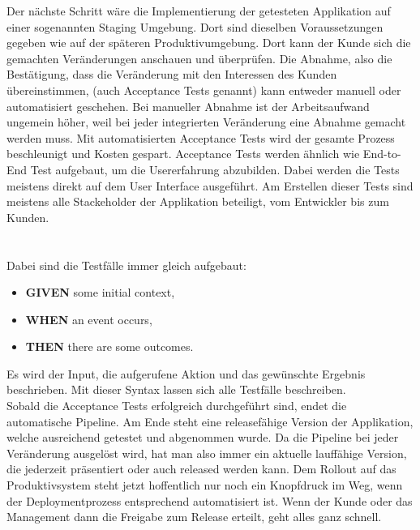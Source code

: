  Der nächste Schritt wäre die Implementierung der getesteten Applikation auf einer sogenannten Staging Umgebung. Dort sind dieselben Voraussetzungen gegeben wie auf der späteren Produktivumgebung.\autocite[Vgl.][S.283]{Farley.2010} Dort kann der Kunde sich die gemachten Veränderungen anschauen und überprüfen. Die Abnahme, also die Bestätigung, dass die Veränderung mit den Interessen des Kunden übereinstimmen, (auch Acceptance Tests genannt) kann entweder manuell oder automatisiert geschehen. Bei manueller Abnahme ist der Arbeitsaufwand ungemein höher, weil bei jeder integrierten Veränderung eine Abnahme gemacht werden muss. Mit automatisierten Acceptance Tests wird der gesamte Prozess beschleunigt und Kosten gespart.\autocite[Vgl.][S.310]{Farley.2010} Acceptance Tests werden ähnlich wie End-to-End Test aufgebaut, um die Usererfahrung abzubilden. Dabei werden die Tests meistens direkt auf dem User Interface ausgeführt. Am Erstellen dieser Tests sind meistens alle Stackeholder der Applikation beteiligt, vom Entwickler bis zum Kunden.\autocite[Vgl.][S.312]{Farley.2010}\\ \\ \\Dabei sind die Testfälle immer gleich aufgebaut\autocite[Vgl.][S.312]{Farley.2010}:
 \begin{itemize}
 	\item\textbf{GIVEN} some initial context,
 	\item\textbf{WHEN} an event occurs,
 	\item\textbf{THEN} there are some outcomes.
 \end{itemize}
Es wird der Input, die aufgerufene Aktion und das gewünschte Ergebnis beschrieben. Mit dieser Syntax lassen sich alle Testfälle beschreiben.\autocite[Vgl.][S.312]{Farley.2010}\\
Sobald die Acceptance Tests erfolgreich durchgeführt sind, endet die automatische Pipeline. Am Ende steht eine releasefähige Version der Applikation, welche ausreichend getestet und abgenommen wurde. Da die Pipeline bei jeder Veränderung ausgelöst wird, hat man also immer ein aktuelle lauffähige Version, die jederzeit präsentiert oder auch released werden kann. Dem Rollout auf das Produktivsystem steht jetzt hoffentlich nur noch ein Knopfdruck im Weg, wenn der Deploymentprozess entsprechend automatisiert ist. Wenn der Kunde oder das Management dann die Freigabe zum Release erteilt, geht alles ganz schnell.\autocite[Vgl.][S.289]{Farley.2010}
